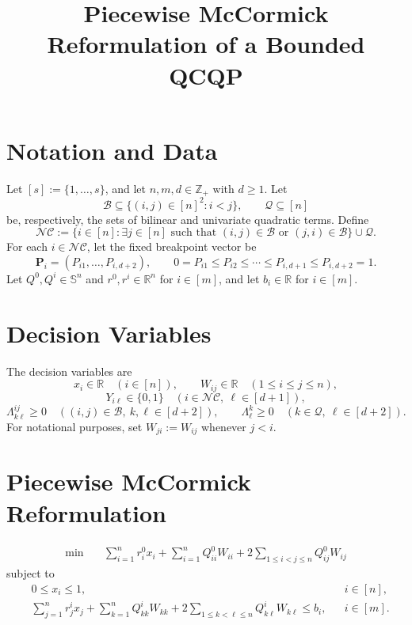 \documentclass{article}
\title{Piecewise McCormick Reformulation of a Bounded QCQP}
\author{}
\date{}
\begin{document}
\maketitle

\section*{Notation and Data}
Let $[s]:=\{1,\ldots,s\}$, and let $n,m,d\in\mathbb{Z}_{+}$ with $d\geq 1$. Let
\[
\mathcal{B}\subseteq\{(i,j)\in[n]^2:i<j\},
\qquad
\mathcal{Q}\subseteq[n]
\]
be, respectively, the sets of bilinear and univariate quadratic terms. Define
\[
\mathcal{NC}:=
\bigl\{i\in[n]:\exists j\in[n]\text{ such that }(i,j)\in\mathcal{B}\text{ or }(j,i)\in\mathcal{B}\bigr\}\cup\mathcal{Q}.
\]
For each $i\in\mathcal{NC}$, let the fixed breakpoint vector be
\[
\mathbf{P}_i=(P_{i1},\ldots,P_{i,d+2}),
\qquad
0=P_{i1}\leq P_{i2}\leq\cdots\leq P_{i,d+1}\leq P_{i,d+2}=1.
\]
Let $Q^0,Q^i\in\mathbb{S}^n$ and $r^0,r^i\in\mathbb{R}^n$ for $i\in[m]$, and let $b_i\in\mathbb{R}$ for $i\in[m]$.

\section*{Decision Variables}
The decision variables are
\[
x_i\in\mathbb{R}\quad(i\in[n]),
\qquad
W_{ij}\in\mathbb{R}\quad(1\leq i\leq j\leq n),
\]
\[
Y_{i\ell}\in\{0,1\}\quad(i\in\mathcal{NC},\ \ell\in[d+1]),
\]
\[
\Lambda^{ij}_{k\ell}\geq 0
\quad((i,j)\in\mathcal{B},\ k,\ell\in[d+2]),
\qquad
\Lambda^k_\ell\geq 0
\quad(k\in\mathcal{Q},\ \ell\in[d+2]).
\]
For notational purposes, set $W_{ji}:=W_{ij}$ whenever $j<i$.

\section*{Piecewise McCormick Reformulation}
\begin{align}
\min\quad
&\sum_{i=1}^{n}r^0_i x_i
 +\sum_{i=1}^{n}Q^0_{ii}W_{ii}
 +2\sum_{1\leq i<j\leq n}Q^0_{ij}W_{ij}
\label{eq:objective}
\end{align}
subject to
\begin{align}
&0\leq x_i\leq 1,
&& i\in[n],
\label{eq:xbounds}\\
&\sum_{j=1}^{n}r^i_jx_j
 +\sum_{k=1}^{n}Q^i_{kk}W_{kk}
 +2\sum_{1\leq k<\ell\leq n}Q^i_{k\ell}W_{k\ell}
 \leq b_i,
&& i\in[m].
\label{eq:baseconstraints}
\end{align}
\end{document}
